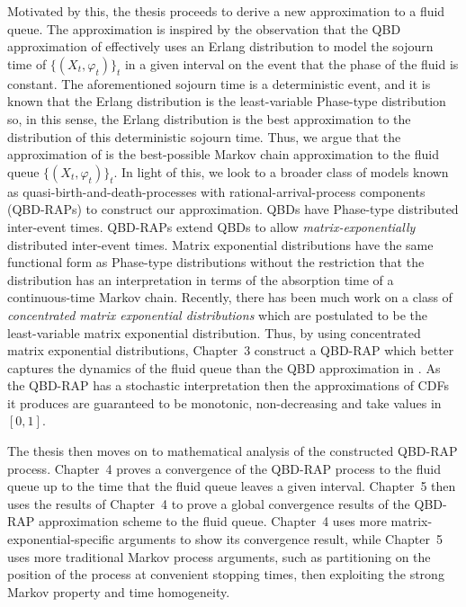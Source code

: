 \documentclass[a4paper]{article}
\begin{document}
Motivated by this, the thesis proceeds to derive a new approximation to a fluid queue. The approximation is inspired by the observation that the QBD approximation of \cite{bo2013} effectively uses an Erlang distribution to model the sojourn time of \(\{(X_t,\varphi_t)\}_t\) in a given interval on the event that the phase of the fluid is constant. The aforementioned sojourn time is a deterministic event, and it is known that the Erlang distribution is the least-variable Phase-type distribution so, in this sense, the Erlang distribution is the best approximation to the distribution of this deterministic sojourn time. Thus, we argue that the approximation of \cite{bo2013} is the best-possible Markov chain approximation to the fluid queue \(\{(X_t,\varphi_t)\}_t\). In light of this, we look to a broader class of models known as quasi-birth-and-death-processes with rational-arrival-process components (QBD-RAPs) \cite{bn2010} to construct our approximation. QBDs have Phase-type distributed inter-event times. QBD-RAPs extend QBDs to allow \emph{matrix-exponentially} distributed inter-event times. Matrix exponential distributions have the same functional form as Phase-type distributions without the restriction that the distribution has an interpretation in terms of the absorption time of a continuous-time Markov chain. Recently, there has been much work on a class of \emph{concentrated matrix exponential distributions} \cite{hhat2020} which are postulated to be the least-variable matrix exponential distribution.  Thus, by using concentrated matrix exponential distributions, Chapter~3 construct a QBD-RAP which better captures the dynamics of the fluid queue than the QBD approximation in \cite{bo2013}. As the QBD-RAP has a stochastic interpretation then the approximations of CDFs it produces are guaranteed to be monotonic, non-decreasing and take values in \([0,1]\).

The thesis then moves on to mathematical analysis of the constructed QBD-RAP process. Chapter~4 proves a convergence of the QBD-RAP process to the fluid queue up to the time that the fluid queue leaves a given interval. Chapter~5 then uses the results of Chapter~4 to prove a global convergence results of the QBD-RAP approximation scheme to the fluid queue. Chapter~4 uses more matrix-exponential-specific arguments to show its convergence result, while Chapter~5 uses more traditional Markov process arguments, such as partitioning on the position of the process at convenient stopping times, then exploiting the strong Markov property and time homogeneity. 
\end{document}
